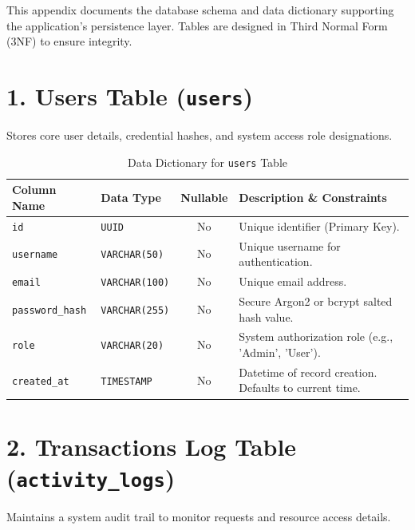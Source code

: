 This appendix documents the database schema and data dictionary supporting the application's persistence layer. Tables are designed in Third Normal Form (3NF) to ensure integrity.

\section*{1. Users Table (\texttt{users})}
Stores core user details, credential hashes, and system access role designations.

\begin{table}[htbp]
  \centering
  \caption{Data Dictionary for \texttt{users} Table}
  \label{tab:db-users}
  \small
  \renewcommand{\arraystretch}{1.1}
  \begin{tabularx}{\textwidth}{|l|l|c|X|}
    \hline
    \textbf{Column Name} & \textbf{Data Type} & \textbf{Nullable} & \textbf{Description \& Constraints} \\
    \hline
    \texttt{id} & \texttt{UUID} & No & Unique identifier (Primary Key). \\
    \texttt{username} & \texttt{VARCHAR(50)} & No & Unique username for authentication. \\
    \texttt{email} & \texttt{VARCHAR(100)} & No & Unique email address. \\
    \texttt{password\_hash} & \texttt{VARCHAR(255)} & No & Secure Argon2 or bcrypt salted hash value. \\
    \texttt{role} & \texttt{VARCHAR(20)} & No & System authorization role (e.g., 'Admin', 'User'). \\
    \texttt{created\_at} & \texttt{TIMESTAMP} & No & Datetime of record creation. Defaults to current time. \\
    \hline
  \end{tabularx}
\end{table}

\section*{2. Transactions Log Table (\texttt{activity\_logs})}
Maintains a system audit trail to monitor requests and resource access details.

